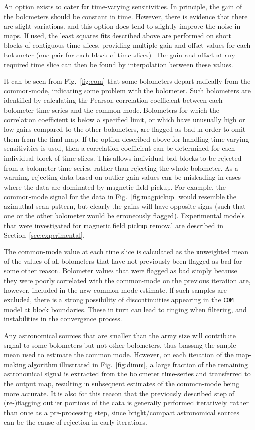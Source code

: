 \documentclass[useAMS,usenatbib,nofootinbib]{mn2e}
\newcommand{\model}[1]{\texttt{#1}}
\begin{document}
An option exists to cater for time-varying sensitivities. In
principle, the gain of the bolometers should be constant in
time. However, there is evidence that there are slight variations, and
this option does tend to slightly improve the noise in maps.  If used,
the least squares fits described above are performed on short blocks
of contiguous time slices, providing multiple gain and offset values
for each bolometer (one pair for each block of time slices). The gain
and offset at any required time slice can then be found by
interpolation between these values.

It can be seen from Fig.~\ref{fig:com} that some bolometers depart
radically from the common-mode, indicating some problem with the
bolometer. Such bolometers are identified by calculating the Pearson
correlation coefficient between each bolometer time-series and the
common mode. Bolometers for which the correlation coefficient is below
a specified limit, or which have unusually high or low gains compared
to the other bolometers, are flagged as bad in order to omit them from
the final map. If the option described above for handling time-varying
sensitivities is used, then a correlation coefficient can be
determined for each individual block of time slices.  This allows
individual bad blocks to be rejected from a bolometer time-series,
rather than rejecting the whole bolometer. As a warning, rejecting
data based on outlier gain values can be misleading in cases where the
data are dominated by magnetic field pickup. For example, the
common-mode signal for the data in Fig.~\ref{fig:magpickup} would
resemble the azimuthal scan pattern, but clearly the gains will have
opposite signs (such that one or the other bolometer would be
erroneously flagged). Experimental models that were investigated for
magnetic field pickup removal are described in
Section~\ref{sec:experimental}.

The common-mode value at each time slice is calculated as the
unweighted mean of the values of all bolometers that have not
previously been flagged as bad for some other reason. Bolometer values
that were flagged as bad simply because they were poorly correlated
with the common-mode on the previous iteration are, however, included
in the new common-mode estimate. If such samples are excluded, there
is a strong possibility of discontinuities appearing in the
\model{COM} model at block boundaries.  These in turn can lead to
ringing when filtering, and instabilities in the convergence
process.

Any astronomical sources that are smaller than the array size will
contribute signal to some bolometers but not other bolometers, thus
biassing the simple mean used to estimate the common mode. However, on
each iteration of the map-making algorithm illustrated in
Fig.~\ref{fig:dimm}, a large fraction of the remaining astronomical
signal is extracted from the bolometer time-series and transferred to
the output map, resulting in subsequent estimates of the common-mode
being more accurate. It is also for this reason that the previously
described step of (re-)flagging outlier portions of the data is
generally performed iteratively, rather than once as a pre-processing
step, since bright/compact astronomical sources can be the cause of
rejection in early iterations.
\end{document}
